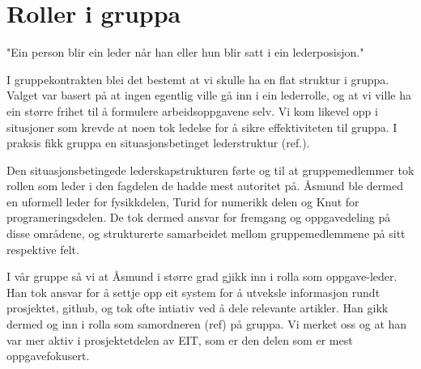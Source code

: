 \section{Roller i gruppa}
"Ein person blir ein leder når han eller hun blir satt i ein lederposisjon."

I gruppekontrakten blei det bestemt at vi skulle ha en flat struktur i gruppa. 
Valget var basert på at ingen egentlig ville gå inn i ein lederrolle, og at vi 
ville ha ein større frihet til å formulere arbeidsoppgavene selv. 
Vi kom likevel opp i situsjoner som krevde at noen tok ledelse for å sikre 
effektiviteten til gruppa. I praksis fikk gruppa en situasjonsbetinget 
lederstruktur (ref.).

Den situasjonsbetingede lederskapstrukturen førte og til at gruppemedlemmer 
tok rollen som leder i den fagdelen de hadde mest autoritet på. Åsmund ble dermed 
en uformell leder for fysikkdelen, Turid for numerikk delen og Knut for programeringsdelen. 
De tok dermed ansvar for fremgang og oppgavedeling på disse områdene, og strukturerte 
samarbeidet mellom gruppemedlemmene på sitt respektive felt. 

I vår gruppe så vi at Åsmund i større grad gjikk inn i rolla som oppgave-leder. 
Han tok ansvar for å settje opp eit system for å utveksle informasjon rundt 
prosjektet, github, og tok ofte intiativ ved å dele relevante artikler. 
Han gikk dermed og inn i rolla som samordneren (ref) på gruppa. Vi merket oss 
og at han var mer aktiv i prosjektetdelen av EIT, som er den delen som er mest 
oppgavefokusert. 

